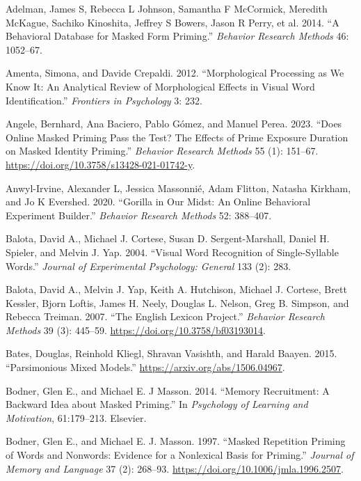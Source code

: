 \documentclass[
]{interact}
\newlength{\cslhangindent}
\newenvironment{CSLReferences}[2] %
 {\begin{list}{}{%
  \setlength{\itemindent}{0pt}
  \setlength{\leftmargin}{0pt}
  \setlength{\parsep}{0pt}
  \ifodd #1
   \setlength{\leftmargin}{\cslhangindent}
   \setlength{\itemindent}{-1\cslhangindent}
  \fi
  \setlength{\itemsep}{#2\baselineskip}}}
 {\end{list}}
\begin{document}
\label{refs}
\begin{CSLReferences}{1}{0}
Adelman, James S, Rebecca L Johnson, Samantha F McCormick, Meredith
McKague, Sachiko Kinoshita, Jeffrey S Bowers, Jason R Perry, et al.
2014. {``A Behavioral Database for Masked Form Priming.''}
\emph{Behavior Research Methods} 46: 1052--67.

Amenta, Simona, and Davide Crepaldi. 2012. {``Morphological Processing
as We Know It: An Analytical Review of Morphological Effects in Visual
Word Identification.''} \emph{Frontiers in Psychology} 3: 232.

Angele, Bernhard, Ana Baciero, Pablo Gómez, and Manuel Perea. 2023.
{``Does Online Masked Priming Pass the Test? The Effects of Prime
Exposure Duration on Masked Identity Priming.''} \emph{Behavior Research
Methods} 55 (1): 151--67.
\url{https://doi.org/10.3758/s13428-021-01742-y}.

Anwyl-Irvine, Alexander L, Jessica Massonnié, Adam Flitton, Natasha
Kirkham, and Jo K Evershed. 2020. {``Gorilla in Our Midst: An Online
Behavioral Experiment Builder.''} \emph{Behavior Research Methods} 52:
388--407.

Balota, David A., Michael J. Cortese, Susan D. Sergent-Marshall, Daniel
H. Spieler, and Melvin J. Yap. 2004. {``Visual Word Recognition of
Single-Syllable Words.''} \emph{Journal of Experimental Psychology:
General} 133 (2): 283.

Balota, David A., Melvin J. Yap, Keith A. Hutchison, Michael J. Cortese,
Brett Kessler, Bjorn Loftis, James H. Neely, Douglas L. Nelson, Greg B.
Simpson, and Rebecca Treiman. 2007. {``The English Lexicon Project.''}
\emph{Behavior Research Methods} 39 (3): 445--59.
\url{https://doi.org/10.3758/bf03193014}.

Bates, Douglas, Reinhold Kliegl, Shravan Vasishth, and Harald Baayen.
2015. {``Parsimonious Mixed Models.''}
\url{https://arxiv.org/abs/1506.04967}.

Bodner, Glen E., and Michael E. J Masson. 2014. {``Memory Recruitment: A
Backward Idea about Masked Priming.''} In \emph{Psychology of Learning
and Motivation}, 61:179--213. Elsevier.

Bodner, Glen E., and Michael E. J. Masson. 1997. {``Masked Repetition
Priming of Words and Nonwords: Evidence for a Nonlexical Basis for
Priming.''} \emph{Journal of Memory and Language} 37 (2): 268--93.
\url{https://doi.org/10.1006/jmla.1996.2507}.


\end{CSLReferences}
\end{document}
